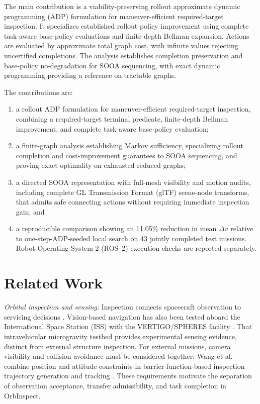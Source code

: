 \documentclass{IEEEtaes}
\theoremstyle{remark}
\theoremstyle{plain}
\begin{document}
The main contribution is a viability-preserving rollout approximate dynamic programming (ADP) formulation for maneuver-efficient required-target inspection. It specializes established rollout policy improvement \cite{bertsekas1997combinatorial,bertsekas2020rollout} using complete task-aware base-policy evaluations and finite-depth Bellman expansion. Actions are evaluated by approximate total graph cost, with infinite values rejecting uncertified completions. The analysis establishes completion preservation and base-policy no-degradation for SOOA sequencing, with exact dynamic programming providing a reference on tractable graphs.

The contributions are:
\begin{enumerate}
  \item a rollout ADP formulation for maneuver-efficient required-target inspection, combining a required-target terminal predicate, finite-depth Bellman improvement, and complete task-aware base-policy evaluation;
  \item a finite-graph analysis establishing Markov sufficiency, specializing rollout completion and cost-improvement guarantees to SOOA sequencing, and proving exact optimality on exhausted reduced graphs;
  \item a directed SOOA representation with full-mesh visibility and motion audits, including complete GL Transmission Format (glTF) scene-node transforms, that admits safe connecting actions without requiring immediate inspection gain; and
  \item a reproducible comparison showing an 11.05\% reduction in mean $\Delta v$ relative to one-step-ADP-seeded local search on 43 jointly completed test missions. Robot Operating System 2 (ROS~2) execution checks are reported separately.
\end{enumerate}


\section{Related Work}
\label{sec:related}

\emph{Orbital inspection and sensing:} Inspection connects spacecraft observation to servicing decisions \cite{flores2014review,kimura2000inspection}. Vision-based navigation has also been tested aboard the International Space Station (ISS) with the VERTIGO/SPHERES facility \cite{tweddle2016facility}. That intravehicular microgravity testbed provides experimental sensing evidence, distinct from external structure inspection. For external missions, camera visibility and collision avoidance must be considered together: Wang et al. combine position and attitude constraints in barrier-function-based inspection trajectory generation and tracking \cite{wang2024inspection}. These requirements motivate the separation of observation acceptance, transfer admissibility, and task completion in OrbInspect.
\end{document}
